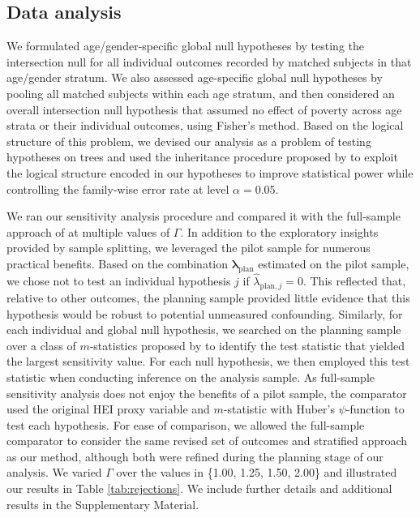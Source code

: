 \documentclass[12pt,leqno,titlepage]{amsart}
\newcommand{\1}{\mathbbm{1}}
\newcommand{\p}{\text{plan}}
\begin{document}
\begin{bibunit}
\subsection{Data analysis}

We formulated age/gender-specific global null hypotheses by testing the intersection null for all individual outcomes recorded by matched subjects in that age/gender stratum. We also assessed age-specific global null hypotheses by pooling all matched subjects within each age stratum, and then considered an overall intersection null hypothesis that assumed no effect of poverty across age strata or their individual outcomes, using Fisher's method. Based on the logical structure of this problem, we devised our analysis as a problem of testing hypotheses on trees 
and used the inheritance procedure proposed by \cite{goeman2012inheritance} to exploit the logical structure encoded in our hypotheses to improve statistical power while controlling the family-wise error rate at level $\alpha=0.05$.

We ran our sensitivity analysis procedure and compared it with the full-sample approach of \cite{cohen2020multivariate} at multiple values of $\Gamma$. In addition to the exploratory insights provided by sample splitting,
we leveraged the pilot sample for numerous practical benefits. Based on the combination $\widehat{\boldsymbol{\lambda}}_\p$ estimated on the pilot sample, we chose not to test an individual hypothesis $j$ if $\widehat{{\lambda}}_{\p, j} = 0$. This reflected that, relative to other outcomes, the planning sample provided little evidence that this hypothesis would be robust to potential unmeasured confounding.
Similarly, for each individual and global null hypothesis, we searched on the planning sample over a class of $m$-statistics proposed by \cite{rosenbaum2007sensitivity} to identify the test statistic that yielded the largest sensitivity value. For each null hypothesis, we then employed this test statistic when conducting inference on the analysis sample. As full-sample sensitivity analysis does not enjoy the benefits of a pilot sample, the comparator used the original HEI proxy variable and $m$-statistic with Huber's $\psi$-function to test each hypothesis. 
For ease of comparison, we allowed the full-sample comparator to consider the same revised set of outcomes and stratified approach as our method, although both were refined during the planning stage of our analysis. We varied $\Gamma$ over the values in \{1.00, 1.25, 1.50, 2.00\} and illustrated our results in Table \ref{tab:rejections}. We include further details and additional results in the Supplementary Material.



\end{bibunit}
\end{document}
